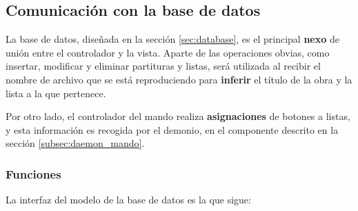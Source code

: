 \subsection{Comunicación con la base de datos}
\label{subsec:web_database}

La base de datos, diseñada en la sección \ref{sec:database}, es el principal \textbf{nexo} de unión entre el controlador y la vista. Aparte de las operaciones obvias, como insertar, modificar y eliminar partituras y listas, será utilizada al recibir el nombre de archivo que se está reproduciendo para \textbf{inferir} el título de la obra y la lista a la que pertenece.

Por otro lado, el controlador del mando realiza \textbf{asignaciones} de botones a listas, y esta información es recogida por el demonio, en el componente descrito en la sección \ref{subsec:daemon_mando}.

\subsubsection{Funciones}

La interfaz del modelo de la base de datos es la que sigue:

